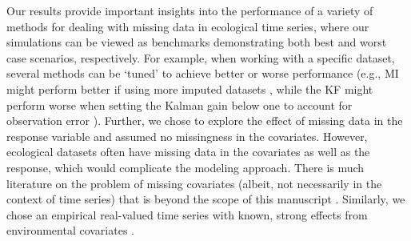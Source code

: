 \documentclass[12pt,english]{article} %
\begin{document}
\begin{linenumbers}
\begin{spacing}{1.9}
\begin{flushleft}
\hspace{1em} Our results provide important insights into the performance of a variety of methods for dealing with missing data in ecological time series, where our simulations can be viewed as benchmarks demonstrating both best and worst case scenarios, respectively. For example, when working with a specific dataset, several methods can be `tuned' to achieve better or worse performance (e.g., MI might perform better if using more imputed datasets \citep{honaker_what_2010}, while the KF might perform worse when setting the Kalman gain below one to account for observation error \citep{kalman_filter_1960}). Further, we chose to explore the effect of missing data in the response variable and assumed no missingness in the covariates. However, ecological datasets often have missing data in the covariates as well as the response, which would complicate the modeling approach. There is much literature on the problem of missing covariates (albeit, not necessarily in the context of time series) that is beyond the scope of this manuscript \citep{Little_1992}.
Similarly, we chose an empirical real-valued time series with known, strong effects from environmental covariates \citep{hall_turbidity_2015,bernhardt2022light}. %

\end{flushleft}
\end{spacing}
\end{linenumbers}
\end{document}
